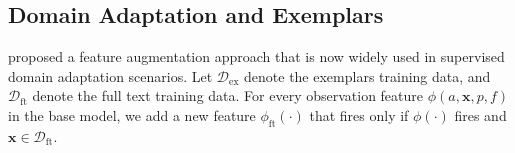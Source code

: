 \documentclass[11pt,a4paper]{article}
\newcommand{\indicator}[1]{I_{\{#1\}}} %
\newcommand{\exemplars}{\mathrm{ex}}
\newcommand{\fulltext}{\mathrm{ft}}
\newcommand{\ensuretext}[1]{#1}
\newcommand{\stmarker}{\ensuretext{\textcolor{orange}{\ensuremath{^{\textsc{S}}_{\textsc{T}}}}}}
\newcommand{\arkcomment}[3]{\ensuretext{\textcolor{#3}{[#1 #2]}}}
\newcommand{\st}[1]{\arkcomment{\stmarker}{#1}{orange}}
\newcommand{\x}{\mathbf{x}}
\begin{document}
\subsection{Domain Adaptation and Exemplars}
\label{sec:frust}
 proposed a feature augmentation approach that is now
widely used in supervised domain adaptation scenarios.
Let $\mathcal{D}_{\exemplars}$ denote the exemplars training data, and
$\mathcal{D}_{\fulltext}$ denote the full text training data.
For every observation feature $\phi(a, \mathbf{x}, p, f)$ in the base model, we add a new
feature $\phi_{\fulltext}(\cdot)$ that fires only if $\phi(\cdot)$ fires and $\x \in \mathcal{D}_{\fulltext}$.
\end{document}
